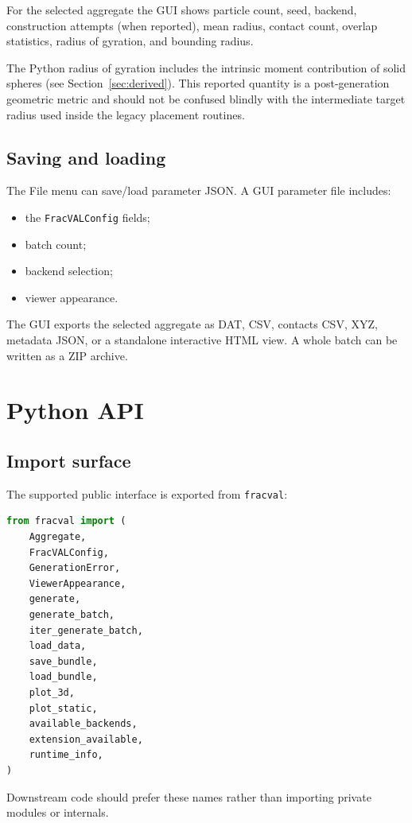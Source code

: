 \documentclass[11pt,oneside]{report}
\newcommand{\code}[1]{\texttt{#1}}
\begin{document}
For the selected aggregate the GUI shows particle count, seed, backend,
construction attempts (when reported), mean radius, contact count, overlap
statistics, radius of gyration, and bounding radius.

The Python radius of gyration includes the intrinsic moment contribution of
solid spheres (see Section~\ref{sec:derived}). This reported quantity is a
post-generation geometric metric and should not be confused blindly with the
intermediate target radius used inside the legacy placement routines.

\section{Saving and loading}

The File menu can save/load parameter JSON. A GUI parameter file includes:
\begin{itemize}
  \item the \code{FracVALConfig} fields;
  \item batch count;
  \item backend selection;
  \item viewer appearance.
\end{itemize}

The GUI exports the selected aggregate as DAT, CSV, contacts CSV, XYZ, metadata
JSON, or a standalone interactive HTML view. A whole batch can be written as a
ZIP archive.

\chapter{Python API}

\section{Import surface}

The supported public interface is exported from \code{fracval}:

\begin{lstlisting}[language=Python]
from fracval import (
    Aggregate,
    FracVALConfig,
    GenerationError,
    ViewerAppearance,
    generate,
    generate_batch,
    iter_generate_batch,
    load_data,
    save_bundle,
    load_bundle,
    plot_3d,
    plot_static,
    available_backends,
    extension_available,
    runtime_info,
)
\end{lstlisting}

Downstream code should prefer these names rather than importing private modules
or  internals.
\end{document}
